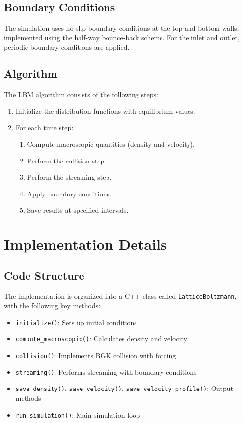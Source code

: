 \documentclass[12pt]{article}
\begin{document}
\subsection{Boundary Conditions}
The simulation uses no-slip boundary conditions at the top and bottom walls, implemented using the half-way bounce-back scheme. For the inlet and outlet, periodic boundary conditions are applied.

\subsection{Algorithm}
The LBM algorithm consists of the following steps:
\begin{enumerate}
    \item Initialize the distribution functions with equilibrium values.
    \item For each time step:
    \begin{enumerate}
        \item Compute macroscopic quantities (density and velocity).
        \item Perform the collision step.
        \item Perform the streaming step.
        \item Apply boundary conditions.
        \item Save results at specified intervals.
    \end{enumerate}
\end{enumerate}

\section{Implementation Details}
\subsection{Code Structure}
The implementation is organized into a C++ class called \texttt{LatticeBoltzmann}, with the following key methods:
\begin{itemize}
    \item \texttt{initialize()}: Sets up initial conditions
    \item \texttt{compute\_macroscopic()}: Calculates density and velocity
    \item \texttt{collision()}: Implements BGK collision with forcing
    \item \texttt{streaming()}: Performs streaming with boundary conditions
    \item \texttt{save\_density()}, \texttt{save\_velocity()}, \texttt{save\_velocity\_profile()}: Output methods
    \item \texttt{run\_simulation()}: Main simulation loop
\end{itemize}
\end{document}
